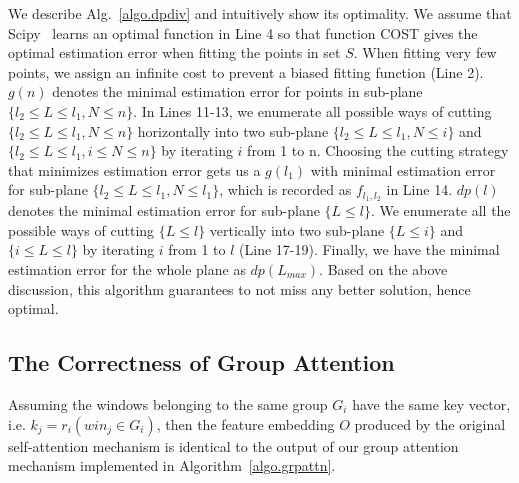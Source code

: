 \begin{sloppypar}
\begin{algorithm}[h]
\begin{algorithmic}[1]
        \end{algorithmic}
\end{algorithm}

We describe Alg.~\ref{algo.dpdiv} and intuitively show its optimality. 
We assume that Scipy~\cite{2020SciPy-NMeth} learns an optimal function in Line 4 so that function COST gives the optimal estimation error when fitting the points in set $S$. 
When fitting very few points, we assign an infinite cost to prevent a biased fitting function (Line 2).  
$g(n)$ denotes the minimal estimation error for points in sub-plane $\{l_2 \leq L \leq l_1, N \leq n\}$. In Lines 11-13, we enumerate all possible ways of cutting $\{l_2 \leq L \leq l_1, N \leq n\}$ horizontally into two sub-plane $\{l_2 \leq L \leq l_1, N \leq i\}$ and $\{l_2 \leq L \leq l_1, i \leq N \leq n\}$ by iterating $i$ from 1 to n. 
Choosing the cutting strategy that minimizes estimation error gets us a $g(l_1)$ with minimal estimation error for sub-plane $\{l_2 \leq L \leq l_1, N \leq l_1\}$, which is recorded as $f_{l_1,l_2}$ in Line 14. 
$dp(l)$ denotes the minimal estimation error for sub-plane $\{L \leq l\}$. 
We enumerate all the possible ways of cutting $\{ L \leq l\}$ vertically into two sub-plane $\{  L \leq i\}$ and $\{i \leq L \leq l\}$ by iterating $i$ from 1 to $l$ (Line 17-19). Finally, we have the minimal estimation error for the whole plane as $dp(L_{max})$. 
Based on the above discussion, this algorithm guarantees to not miss any better solution, hence optimal.



\subsection{The Correctness of Group Attention}
\label{appendix.proof.groupAttention}
\begin{lemma}
\label{lm.grpattnalgo}
\sloppypar
Assuming the windows belonging to the same group $G_i$ have the same key vector, i.e. $k_j=r_i (win_j \in G_i)$, then the feature embedding $O$ produced by the original self-attention mechanism is identical to the output of our group attention mechanism implemented in Algorithm~\ref{algo.grpattn}.


\end{lemma}
\end{sloppypar}
